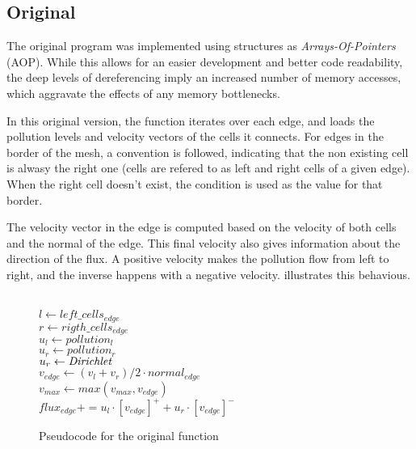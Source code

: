 \subsection{Original}
\label{sec:310}

The original \polu program was implemented using structures as \textit{Arrays-Of-Pointers} (AOP). While this allows for an easier development and better code readability, the deep levels of dereferencing imply an increased number of memory accesses, which aggravate the effects of any memory bottlenecks.

In this original version, the \computeflux function iterates over each edge, and loads the pollution levels and velocity vectors of the cells it connects. For edges in the border of the mesh, a convention is followed, indicating that the non existing cell is alwasy the right one (cells are refered to as left and right cells of a given edge). When the right cell doesn't exist, the \dirichlet condition is used as the value for that border.

The velocity vector in the edge is computed based on the velocity of both cells and the normal of the edge. This final velocity also gives information about the direction of the flux. A positive velocity makes the pollution flow from left to right, and the inverse happens with a negative velocity.  illustrates this behavious.



\begin{figure}[!htp]
	\begin{alg}
						\\
			$l     \gets left\_cells_{edge}$ 	\\
			$r     \gets rigth\_cells_{edge}$ 	\\
			$u_{l} \gets pollution_{l}$ 		
			 			\\
				$u_{r} \gets pollution_{r}$
			\Else 								\\
				$u_{r} \gets \textit{Dirichlet}$ 
			\EndIf 	 							\\
			$v_{edge} \gets (v_{l} + v_{r}) / 2 \cdot normal_{edge}$ 					\\
			$v_{max} \gets max(v_{max}, v_{edge})$ 										\\
			$flux_{edge} += u_{l} \cdot [v_{edge}]^{+} + u_{r} \cdot [v_{edge}]^{-}$
		\EndFor
	\end{alg}

	\caption{Pseudocode for the original \computeflux function}
	\label{alg:flux}
\end{figure}

